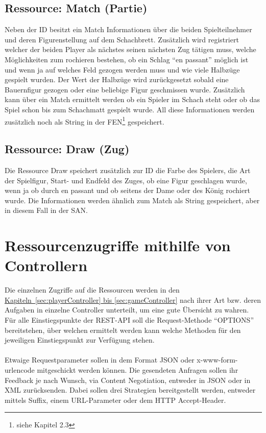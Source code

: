 \subsection{Ressource: Match (Partie)}\label{sec:resmatch}
Neben der ID besitzt ein Match Informationen über die beiden Spielteilnehmer und deren Figurenstellung auf dem Schachbrett. Zusätzlich wird registriert welcher der beiden Player als nächstes seinen nächsten Zug tätigen muss, welche Möglichkeiten zum rochieren bestehen, ob ein Schlag \enquote{en passant} möglich ist und wenn ja auf welches Feld gezogen werden muss und wie viele Halbzüge gespielt wurden. Der Wert der Halbzüge wird zurückgesetzt sobald eine Bauernfigur gezogen oder eine beliebige Figur geschmissen wurde. Zusätzlich kann über ein Match ermittelt werden ob ein Spieler im Schach steht oder ob das Spiel schon bis zum Schachmatt gespielt wurde. All diese Informationen werden zusätzlich noch als String in der \gls{FEN}\footnote{\label{foot:chapter}siehe Kapitel 2.3} gespeichert.

\subsection{Ressource: Draw (Zug)}\label{sec:resdraw}
Die Ressource Draw speichert zusätzlich zur ID die Farbe des Spielers, die Art der Spielfigur, Start- und Endfeld des Zuges, ob eine Figur geschlagen wurde, wenn ja ob durch en passant und ob seitens der Dame oder des König rochiert wurde. Die Informationen werden ähnlich zum Match als String gespeichert, aber in diesem Fall in der \gls{SAN}.

\section{Ressourcenzugriffe mithilfe von Controllern}
Die einzelnen Zugriffe auf die Ressourcen werden in den \hyperref[sec:playerController, sec:gameController]{Kapiteln~\ref{sec:playerController} bis \ref{sec:gameController}} nach ihrer Art bzw. deren Aufgaben in einzelne Controller unterteilt, um eine gute Übersicht zu wahren. Für alle Einstiegspunkte der \gls{REST}-\gls{API} soll die Request-Methode \enquote{OPTIONS} bereitstehen, über welchen ermittelt werden kann welche Methoden für den jeweiligen Einstiegspunkt zur Verfügung stehen.\\
\\
Etwaige Requestparameter sollen in dem Format \gls{JSON} oder x-www-form-urlencode mitgeschickt werden können. Die gesendeten Anfragen sollen ihr Feedback je nach Wunsch, via Content Negotiation, entweder in \gls{JSON} oder in \gls{XML} zurücksenden. Dabei sollen drei Strategien bereitgestellt werden, entweder mittels Suffix, einem URL-Parameter oder dem \gls{HTTP} Accept-Header. 

